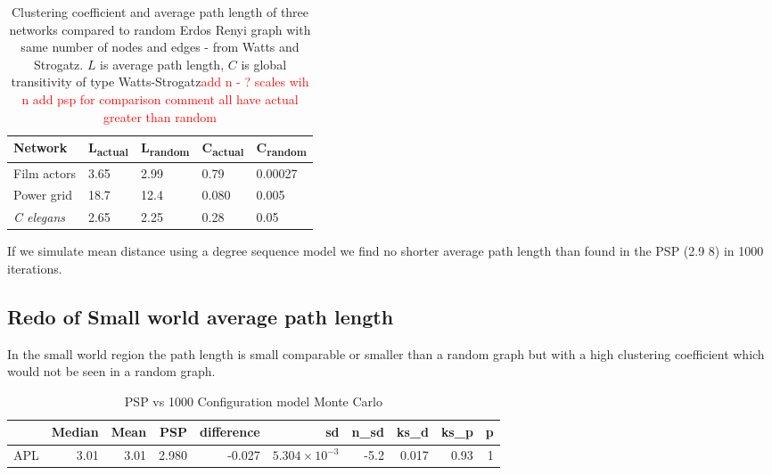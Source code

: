 \begin{table}[h]
    \centering
    \begin{tabular}{lllll}
    \toprule
    Network      & L\textsubscript{actual} & L\textsubscript{random} & C\textsubscript{actual} & C\textsubscript{random} \\
    \midrule
     Film actors    & 3.65 & 2.99 & 0.79 & 0.00027\\
     Power grid & 18.7 & 12.4 & 0.080 & 0.005 \\
     \textit{C elegans} & 2.65 & 2.25 & 0.28 & 0.05 \\
     \bottomrule
    \end{tabular}
    \caption{Clustering coefficient and average path length of three networks compared to random Erdos Renyi graph with same number of nodes and edges - from Watts and Strogatz\cite{watts1998collective}. $L$ is average path length, $C$ is global transitivity of type Watts-Strogatz\textcolor{red}{add n - ? scales wih n add psp for comparison comment all have actual greater than random}}
    \label{tab:clustering and path length Watts and Strogatz}
\end{table}


If we simulate mean distance using a degree sequence model we find no shorter average path length than found in the PSP (2.9 8) in 1000 iterations.


\subsection{Redo of Small world average path length}

In the small world region the path length is small comparable  or smaller than a random graph but with a high clustering coefficient which would not be seen in a random graph. 




\begin{table}[ht]
\centering
\begin{adjustbox}{width=\textwidth}

\begin{tabular}{rrrrrrrrrr}
  \toprule
 & Median & Mean & PSP & difference & sd & n\_sd & ks\_d & ks\_p & p \\ 
  \midrule
APL & 3.01 & 3.01 & 2.980 & -0.027 & $5.304 \times 10^{-3}$ & -5.2 & 0.017 & 0.93 & 1 \\ 

   \bottomrule
\end{tabular}
\end{adjustbox}
\caption{PSP vs 1000 Configuration model Monte Carlo} 
\end{table}



